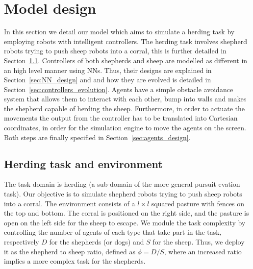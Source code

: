 \documentclass[conference]{IEEEtran}
\begin{document}
\section{Model design}
In this section we detail our model which aims to simulate a herding task by employing robots with intelligent controllers.
The herding task involves shepherd robots trying to push sheep robots into a corral, this is further detailed in Section~\ref{sec:herding_task_environment}.
Controllers of both shepherds and sheep are modelled as different in an high level manner using NNs.
Thus, their designs are explained in Section~\ref{sec:NN_design} and and how they are evolved is detailed in Section~\ref{sec:controllers_evolution}.
Agents have a simple obstacle avoidance system that allows them to interact with each other, bump into walls and makes the shepherd capable of herding the sheep.
Furthermore, in order to actuate the movements the output from the controller has to be translated into Cartesian coordinates, in order for the simulation engine to move the agents on the screen.    
Both steps are finally specified in Section~\ref{sec:agents_design}.

\subsection{Herding task and environment}
\label{sec:herding_task_environment}
The task domain is herding (a sub-domain of the more general pursuit evation task).
Our objective is to simulate shepherd robots trying to push sheep robots into a corral. 
The environment consists of a $l \times l$ squared pasture with fences on the top and bottom.
The corral is positioned on the right side, and the pasture is open on the left side for the sheep to escape.
We module the task complexity by controlling the number of agents of each type that take part in the task, respectively $D$ for the shepherds (or dogs) and $S$ for the sheep.
Thus, we deploy it as the shepherd to sheep ratio, defined as $\phi = D / S$, where an increased ratio implies a more complex task for the shepherds.
\end{document}
